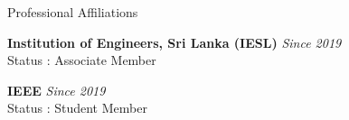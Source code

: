 \documentclass[
	11pt, %
]{./assets/resume} %
\begin{document}








\begin{rSection}{Professional Affiliations}

	\textbf{Institution of Engineers, Sri Lanka (IESL)} \hfill \textit{Since 2019} \\ 
	Status : Associate Member

	\textbf{IEEE} \hfill \textit{Since 2019} \\ 
	Status : Student Member

\end{rSection}




\end{document}
